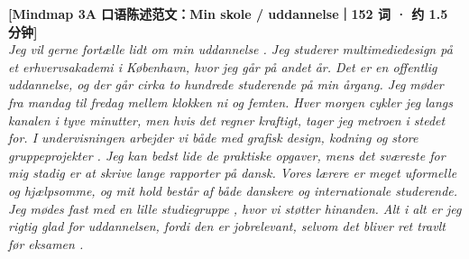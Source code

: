 \begin{transbox}
\small
\textbf{\color{NCDNavy}[Mindmap 3A 口语陈述范文：Min skole / uddannelse｜152 词 · 约 1.5 分钟]}\\
\textit{Jeg vil gerne fortælle lidt om min uddannelse . Jeg studerer multimediedesign på et erhvervsakademi  i København, hvor jeg går på andet år. Det er en offentlig uddannelse, og der går cirka to hundrede studerende  på min årgang. Jeg møder fra mandag til fredag mellem klokken ni og femten. Hver morgen cykler jeg langs kanalen i tyve minutter, men hvis det regner kraftigt, tager jeg metroen i stedet for. I undervisningen  arbejder vi både med grafisk design, kodning og store gruppeprojekter . Jeg kan bedst lide de praktiske opgaver, mens det sværeste for mig stadig er at skrive lange rapporter på dansk. Vores lærere er meget uformelle og hjælpsomme, og mit hold består af både danskere og internationale studerende. Jeg mødes fast med en lille studiegruppe , hvor vi støtter hinanden. Alt i alt er jeg rigtig glad for uddannelsen, fordi den er jobrelevant, selvom det bliver ret travlt før eksamen .}
\end{transbox}

